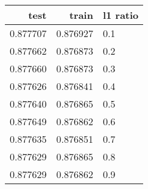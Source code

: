 \begin{tabular}{rrl}
\toprule
     test &     train & l1 ratio \\
\midrule
 0.877707 &  0.876927 &      0.1 \\
 0.877662 &  0.876873 &      0.2 \\
 0.877660 &  0.876873 &      0.3 \\
 0.877626 &  0.876841 &      0.4 \\
 0.877640 &  0.876865 &      0.5 \\
 0.877649 &  0.876862 &      0.6 \\
 0.877635 &  0.876851 &      0.7 \\
 0.877629 &  0.876865 &      0.8 \\
 0.877629 &  0.876862 &      0.9 \\
\bottomrule
\end{tabular}
